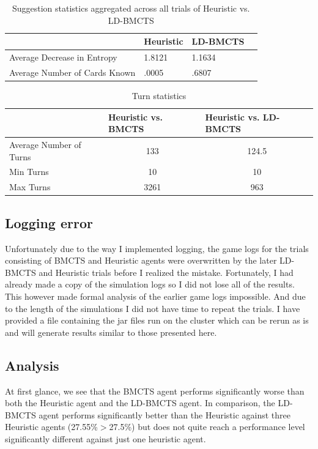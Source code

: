 \documentclass[msc, ai, logo, twoside, notimes, parskip, leftchapter, normalheadings]{infthesis}
\begin{document}
\begin{table}[H]
\centering
\caption{Suggestion statistics aggregated across all trials of Heuristic vs. LD-BMCTS}
\begin{tabular}{l|lll}
& \multicolumn{1}{l|}{Heuristic} & LD-BMCTS \\ \hline \hline
Average Decrease in Entropy & 1.8121 & 1.1634 \\
Average Number of Cards Known & .0005 & .6807 \\
\end{tabular}
\end{table}

\begin{table}[H]
\centering
\caption{Turn statistics}
\begin{tabular}{l|ll}
& \multicolumn{1}{l|}{Heuristic vs. BMCTS} & \multicolumn{1}{l}{Heuristic vs. LD-BMCTS} \\ \hline \hline
Average Number of Turns & \multicolumn{1}{c}{133} & \multicolumn{1}{c}{124.5} \\
Min Turns & \multicolumn{1}{c}{10} & \multicolumn{1}{c}{10} \\
Max Turns & \multicolumn{1}{c}{3261} & \multicolumn{1}{c}{963}
\end{tabular}
\end{table}


\subsection{Logging error}
Unfortunately due to the way I implemented logging, the game logs for the trials consisting of BMCTS and Heuristic agents were overwritten by the later LD-BMCTS and Heuristic trials before I realized the mistake. Fortunately, I had already made a copy of the simulation logs so I did not lose all of the results. This however made formal analysis of the earlier game logs impossible. And due to the length of the simulations I did not have time to repeat the trials. I have provided a file containing the jar files run on the cluster which can be rerun as is and will generate results similar to those presented here.

\subsection{Analysis}
At first glance, we see that the BMCTS agent performs significantly worse than both the Heuristic agent and the LD-BMCTS agent. In comparison, the LD-BMCTS agent performs significantly better than the Heuristic against three Heuristic agents (27.55\%\(>\)27.5\%) but does not quite reach a performance level significantly different against just one heuristic agent. 
\end{document}
